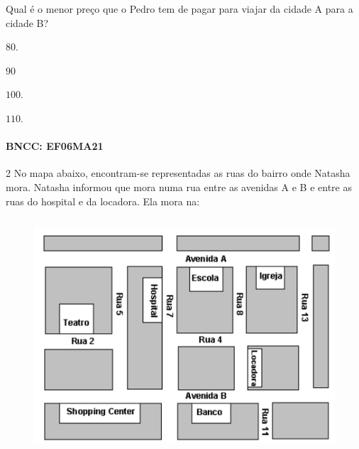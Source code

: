 \noindent Qual é o menor preço que o Pedro tem de pagar para viajar da cidade A
para a cidade B?

\begin{escolha}
\item $80$.
\item $90$
\item $100$.
\item $110$.
\end{escolha}

\paragraph{BNCC: EF06MA21 }


\num{2}  No mapa abaixo, encontram-se representadas as ruas do bairro onde
Natasha mora. Natasha informou que mora numa rua entre as avenidas A e B e entre as
ruas do hospital e da locadora. Ela mora na:

\begin{figure}
\includegraphics[width=4.76042in,height=3.42708in]{./imgSAEB_6_MAT/media/image75.png}
\end{figure}

